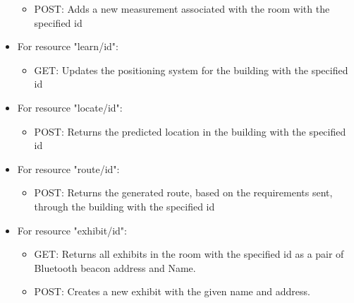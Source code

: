 \begin{itemize}
\begin{itemize}
	\item POST: Adds a new measurement associated with the room with the specified id
	\end{itemize}
\item For resource "learn/id":
	\begin{itemize}
	\item GET: Updates the positioning system for the building with the specified id
	\end{itemize}
\item For resource "locate/id":
	\begin{itemize}
	\item POST: Returns the predicted location in the building with the specified id
	\end{itemize}
\item For resource "route/id":
	\begin{itemize}
	\item POST: Returns the generated route, based on the requirements sent, through the building with the specified id
	\end{itemize}
\item For resource "exhibit/id":
	\begin{itemize}
	\item GET: Returns all exhibits in the room with the specified id as a pair of Bluetooth beacon address and Name.
	\item POST: Creates a new exhibit with the given name and address.
	\end{itemize}
\end{itemize}

